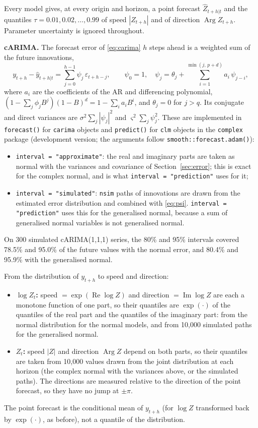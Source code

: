 \documentclass[11pt,a4paper]{article}
\newcommand{\code}[1]{\texttt{#1}}
\DeclareMathOperator{\Arg}{Arg}
\newcommand{\1}{\mathbf{1}}
\renewcommand{\Re}{\operatorname{Re}}
\renewcommand{\Im}{\operatorname{Im}}
\begin{document}
Every model gives, at every origin and horizon, a point forecast $\hat Z_{t+h|t}$ and the
quantiles $\tau = 0.01, 0.02, \dots, 0.99$ of speed $|Z_{t+h}|$ and of direction $\Arg Z_{t+h}$.
Parameter uncertainty is ignored throughout.

\textbf{cARIMA.} The forecast error of \eqref{eq:carima} $h$ steps ahead is a weighted sum of the
future innovations,
\begin{equation}\label{eq:psi}
  y_{t+h} - \hat y_{t+h|t} = \sum_{j=0}^{h-1}\psi_j\,\varepsilon_{t+h-j}, \qquad
  \psi_0 = 1, \quad \psi_j = \theta_j + \sum_{i=1}^{\min(j,\,p+d)} a_i\,\psi_{j-i},
\end{equation}
where $a_i$ are the coefficients of the AR and differencing polynomial,
$(1 - \sum_j\phi_j B^j)(1-B)^d = 1 - \sum_i a_i B^i$, and $\theta_j = 0$ for $j > q$. Its conjugate
and direct variances are $\sigma^2\sum_j|\psi_j|^2$ and $\varsigma^2\sum_j\psi_j^2$. These are
implemented in \code{forecast()} for \code{carima} objects and \code{predict()} for \code{clm}
objects in the \code{complex} package (development version; the arguments follow
\code{smooth::forecast.adam()}):
\begin{itemize}
  \item \code{interval = "approximate"}: the real and imaginary parts are taken as normal with the
    variances and covariance of Section~\ref{sec:error}; this is exact for the complex normal, and
    is what \code{interval = "prediction"} uses for it;
  \item \code{interval = "simulated"}: \code{nsim} paths of innovations are drawn from the
    estimated error distribution and combined with \eqref{eq:psi}. \code{interval =
    "prediction"} uses this for the generalised normal, because a sum of generalised normal
    variables is not generalised normal.
\end{itemize}
On 300 simulated cARIMA(1,1,1) series, the 80\% and 95\% intervals covered 78.5\% and 95.0\% of
the future values with the normal error, and 80.4\% and 95.9\% with the generalised normal.

From the distribution of $y_{t+h}$ to speed and direction:
\begin{itemize}
  \item \textbf{$\log Z_t$:} speed $= \exp(\Re\log Z)$ and direction $= \Im\log Z$ are each a
    monotone function of one part, so their quantiles are $\exp(\cdot)$ of the quantiles of the
    real part and the quantiles of the imaginary part: from the normal distribution for the
    normal models, and from 10,000 simulated paths for the generalised normal.
  \item \textbf{$Z_t$:} speed $|Z|$ and direction $\Arg Z$ depend on both parts, so their quantiles
    are taken from 10,000 values drawn from the joint distribution at each horizon (the complex
    normal with the variances above, or the simulated paths). The directions are measured
    relative to the direction of the point forecast, so they have no jump at $\pm\pi$.
\end{itemize}
The point forecast is the conditional mean of $y_{t+h}$ (for $\log Z$ transformed back by
$\exp(\cdot)$, as before), not a quantile of the distribution.
\end{document}
